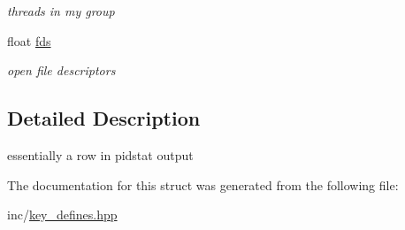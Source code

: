 \begin{DoxyCompactItemize}
\begin{DoxyCompactList}\small\item\em threads in my group \end{DoxyCompactList}\item 
\hypertarget{structclpr__d_1_1pid__blob_a5072d3d2bc2e6aebee93ba70869aee47}{float \hyperlink{structclpr__d_1_1pid__blob_a5072d3d2bc2e6aebee93ba70869aee47}{fds}}\label{structclpr__d_1_1pid__blob_a5072d3d2bc2e6aebee93ba70869aee47}

\begin{DoxyCompactList}\small\item\em open file descriptors \end{DoxyCompactList}\end{DoxyCompactItemize}


\subsection{\-Detailed \-Description}
essentially a row in pidstat output 

\-The documentation for this struct was generated from the following file\-:\begin{DoxyCompactItemize}
\item 
inc/\hyperlink{key__defines_8hpp}{key\-\_\-defines.\-hpp}\end{DoxyCompactItemize}
